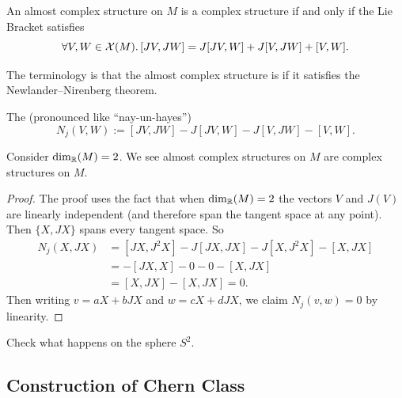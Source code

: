 \begin{theorem}
An almost complex structure on $M$ is a complex structure if and only
if the Lie Bracket satisfies
\begin{equation}
\forall V,W\in\mathcal{X}(M)\ldotp[JV,JW]=J[JV,W]+J[V,JW]+[V,W].
\end{equation}
\end{theorem}

\begin{remark}
The terminology is that the almost complex structure is 
if it satisfies the Newlander--Nirenberg theorem.
\end{remark}

\begin{definition}
The  (pronounced like ``nay-un-hayes'')
\begin{equation}
N_{j}(V,W) := [JV,JW]-J[JV,W]-J[V,JW]-[V,W].
\end{equation}
\end{definition}

\begin{corollary}
Consider $\dim_{\mathbb{R}}(M)=2$. We see almost complex structures on $M$
are complex structures on $M$.
\end{corollary}

\begin{proof}
The proof uses the fact that when $\dim_{\mathbb{R}}(M)=2$ the vectors $V$
and $J(V)$ are linearly independent (and therefore span the tangent
space at any point). Then $\{X,JX\}$ spans every tangent space. So
\begin{subequations}
  \begin{align}
N_{j}(X,JX) &= [JX,J^{2}X] - J[JX,JX] - J[X,J^{2}X]-[X,JX]\\
&=-[JX,X]-0-0-[X,JX]\\
&=[X,JX]-[X,JX]=0.
  \end{align}
\end{subequations}
Then writing $v=aX+bJX$ and $w=cX+dJX$, we claim $N_{j}(v,w)=0$ by
linearity. 
\end{proof}

\begin{xca}
Check what happens on the sphere $S^{2}$.
\end{xca}

\subsection{Construction of Chern Class}

